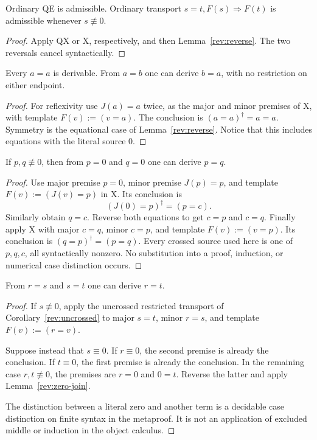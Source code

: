 \begin{corollary}\label{rev:uncrossed}
Ordinary QE is admissible. Ordinary transport
$s=t,F(s)\Rightarrow F(t)$ is admissible whenever $s\not\equiv0$.
\end{corollary}
\begin{proof}
Apply QX or X, respectively, and then Lemma~\ref{rev:reverse}.
The two reversals cancel syntactically.
\end{proof}

\begin{lemma}\label{rev:refl-symm}
Every $a=a$ is derivable. From $a=b$ one can derive $b=a$, with no
restriction on either endpoint.
\end{lemma}
\begin{proof}
For reflexivity use $J(a)=a$ twice, as the major and minor premises of X,
with template $F(v):=(v=a)$. The conclusion is $(a=a)^\dagger=a=a$.
Symmetry is the equational case of Lemma~\ref{rev:reverse}. Notice that
this includes equations with the literal source $0$.
\end{proof}

\begin{lemma}\label{rev:zero-join}
If $p,q\not\equiv0$, then from $p=0$ and $q=0$ one can derive $p=q$.
\end{lemma}
\begin{proof}
Use major premise $p=0$, minor premise $J(p)=p$, and template
$F(v):=(J(v)=p)$ in X. Its conclusion is
\[
                     (J(0)=p)^\dagger=(p=c).
\]
Similarly obtain $q=c$. Reverse both equations to get $c=p$ and
$c=q$. Finally apply X with major $c=q$, minor $c=p$, and template
$F(v):=(v=p)$. Its conclusion is $(q=p)^\dagger=(p=q)$.
Every crossed source used here is one of $p,q,c$, all syntactically
nonzero. No substitution into a proof, induction, or numerical case
distinction occurs.
\end{proof}

\begin{lemma}\label{rev:trans}
From $r=s$ and $s=t$ one can derive $r=t$.
\end{lemma}
\begin{proof}
If $s\not\equiv0$, apply the uncrossed restricted transport of
Corollary~\ref{rev:uncrossed} to major $s=t$, minor $r=s$, and
template $F(v):=(r=v)$.

Suppose instead that $s\equiv0$. If $r\equiv0$, the second premise is
already the conclusion. If $t\equiv0$, the first premise is already
the conclusion. In the remaining case $r,t\not\equiv0$, the premises
are $r=0$ and $0=t$. Reverse the latter and apply
Lemma~\ref{rev:zero-join}.

The distinction between a literal zero and another term is a decidable
case distinction on finite syntax in the metaproof. It is not an
application of excluded middle or induction in the object calculus.
\end{proof}

